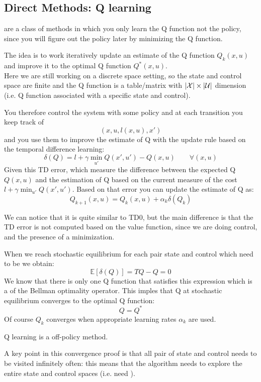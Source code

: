 \subsection{Direct Methods: Q learning}
 are a class of methods in which you only learn the Q function not the policy, since you will figure out the policy later by  minimizing the Q function.

The idea is to work iteratively update an estimate of the Q function $Q_k(x,u)$ and improve it to the optimal Q function $Q^*(x,u)$.\\
Here we are still working on a discrete space setting, so the state and control space are finite and the Q function is a table/matrix with $\lvert\mathcal{X}\rvert\times\lvert\mathcal{U}\rvert$ dimension (i.e. Q function associated with a specific state and control).

You therefore control the system with some policy and at each transition you keep track of 
\[(x,u,l(x,u), x')\]
and you use them to improve the estimate of Q with the update rule based on the temporal difference learning:
\[\delta(Q) = l + \gamma \min_{u'}Q(x',u') - Q(x,u)\qquad \forall (x,u)\]
Given this TD error, which measure the difference between the expected Q $Q(x,u)$ and the estimation of Q based on the current measure of the cost $l + \gamma\min_{u'} Q(x',u')$.
Based on that error you can update the estimate of Q as:
\[Q_{k+1}(x,u) = Q_k(x,u) + \alpha_k \delta(Q_k)\]

We can notice that it is quite similar to TD0, but the main difference is that the TD error is not computed based on the value function, since we are doing control, and the presence of a minimization.

When we reach stochastic equilibrium for each pair state and control which need to be  we obtain:
\[\mathbb{E}[\delta(Q)]=TQ-Q=0\]
We know that there is only one Q function that satisfies this expression which is a  of the Bellman optimality operator. This imples that Q at stochastic equilibrium converges to the optimal Q function:
\[Q =Q^*\]
Of course $Q_k$ converges when appropriate learning rates $\alpha_k$ are used.

Q learning is a off-policy method. 

A key point in this convergence proof is that all pair of state and control needs to be visited infinitely often: this means that the algorithm needs to explore the entire state and control spaces (i.e. need ).

